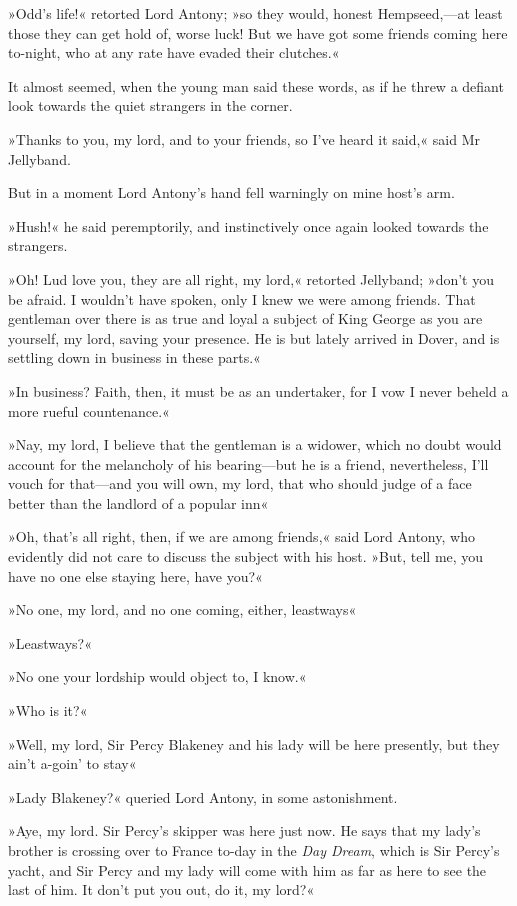 »Odd's life!« retorted Lord Antony; »so they would, honest Hempseed,—at least those they can get hold of, worse luck! But we have got some friends coming here to-night, who at any rate have evaded their clutches.«

It almost seemed, when the young man said these words, as if he threw a defiant look towards the quiet strangers in the corner.

»Thanks to you, my lord, and to your friends, so I've heard it said,« said Mr Jellyband.

But in a moment Lord Antony's hand fell warningly on mine host's arm.

»Hush!« he said peremptorily, and instinctively once again looked towards the strangers.

»Oh! Lud love you, they are all right, my lord,« retorted Jellyband; »don't you be afraid. I wouldn't have spoken, only I knew we were among friends. That gentleman over there is as true and loyal a subject of King George as you are yourself, my lord, saving your presence. He is but lately arrived in Dover, and is settling down in business in these parts.«

»In business? Faith, then, it must be as an undertaker, for I vow I never beheld a more rueful countenance.«

»Nay, my lord, I believe that the gentleman is a widower, which no doubt would account for the melancholy of his bearing—but he is a friend, nevertheless, I'll vouch for that—and you will own, my lord, that who should judge of a face better than the landlord of a popular inn\longdash«

»Oh, that's all right, then, if we are among friends,« said Lord Antony, who evidently did not care to discuss the subject with his host. »But, tell me, you have no one else staying here, have you?«

»No one, my lord, and no one coming, either,  leastways\longdash«

»Leastways?«

»No one your lordship would object to, I know.«

»Who is it?«

»Well, my lord, Sir Percy Blakeney and his lady will be here presently, but they ain't a-goin' to stay\longdash«

»Lady Blakeney?« queried Lord Antony, in some astonishment.

»Aye, my lord. Sir Percy's skipper was here just now. He says that my lady's brother is crossing over to France to-day in the \textit{Day Dream}, which is Sir Percy's yacht, and Sir Percy and my lady will come with him as far as here to see the last of him. It don't put you out, do it, my lord?«

